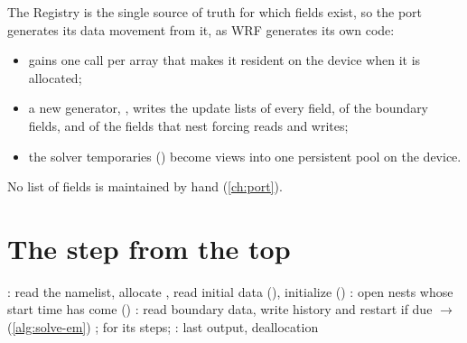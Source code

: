 \begin{portnote}
The Registry is the single source of truth for which fields exist, so the port generates its data movement from it,
as WRF generates its own code:
\begin{itemize}
  \item {} gains one call per array that makes it resident on the device when it is allocated;
  \item a new generator, , writes the update lists of every field, of the boundary fields, and
    of the fields that nest forcing reads and writes;
  \item the solver temporaries () become views into one persistent pool on the device.
\end{itemize}
No list of fields is maintained by hand (\cref{ch:port}).
\end{portnote}

\section{The step from the top}

\begin{algorithm}[ht]
\caption{From  to one model step (one-way nest, simplified).}
\label{alg:top}
\begin{algorithmic}[1]
\State {}: read the namelist, allocate , read initial data (), initialize ()
\State {}:
  \State open nests whose start time has come ()
  \State {}: read boundary data, write history and restart if due
  \State {} $\to$  (\cref{alg:solve-em})
  \State {}
    \State {};  for its steps; 
  \EndFor
\EndWhile
\State {}: last output, deallocation
\end{algorithmic}
\end{algorithm}
